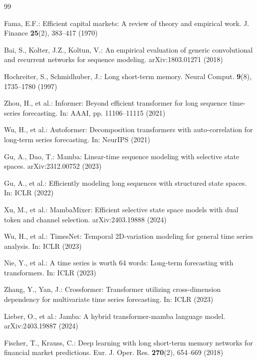 \documentclass[runningheads]{llncs}
\begin{document}

\begin{thebibliography}{99}

Fama, E.F.: Efficient capital markets: A review of theory and empirical work.
J. Finance \textbf{25}(2), 383--417 (1970)

Bai, S., Kolter, J.Z., Koltun, V.: An empirical evaluation of generic convolutional
and recurrent networks for sequence modeling. arXiv:1803.01271 (2018)

Hochreiter, S., Schmidhuber, J.: Long short-term memory.
Neural Comput. \textbf{9}(8), 1735--1780 (1997)

Zhou, H., et al.: Informer: Beyond efficient transformer for long sequence
time-series forecasting. In: AAAI, pp. 11106--11115 (2021)

Wu, H., et al.: Autoformer: Decomposition transformers with auto-correlation
for long-term series forecasting. In: NeurIPS (2021)

Gu, A., Dao, T.: Mamba: Linear-time sequence modeling with selective state spaces.
arXiv:2312.00752 (2023)

Gu, A., et al.: Efficiently modeling long sequences with structured state spaces.
In: ICLR (2022)

Xu, M., et al.: MambaMixer: Efficient selective state space models with dual
token and channel selection. arXiv:2403.19888 (2024)

Wu, H., et al.: TimesNet: Temporal 2D-variation modeling for general time series
analysis. In: ICLR (2023)

Nie, Y., et al.: A time series is worth 64 words: Long-term forecasting with
transformers. In: ICLR (2023)

Zhang, Y., Yan, J.: Crossformer: Transformer utilizing cross-dimension dependency
for multivariate time series forecasting. In: ICLR (2023)

Lieber, O., et al.: Jamba: A hybrid transformer-mamba language model.
arXiv:2403.19887 (2024)

Fischer, T., Krauss, C.: Deep learning with long short-term memory networks
for financial market predictions. Eur. J. Oper. Res. \textbf{270}(2), 654--669
(2018)


\end{thebibliography}
\end{document}
